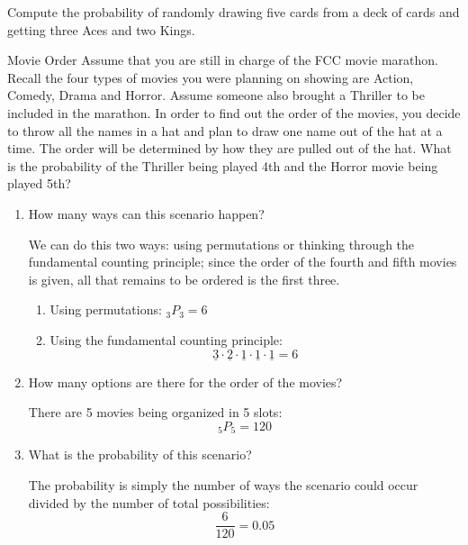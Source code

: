 \begin{try}
Compute the probability of randomly drawing five cards from a deck of cards and getting three Aces and two Kings.
\end{try}

\begin{example}[https://www.youtube.com/watch?v=vG46K6Fr8Yw&list=PLfmpjsIzhzts14-9s5QixRje97EI2oeMF&index=39]{Movie Order}
Assume that you are still in charge of the FCC movie marathon. Recall the
four types of movies you were planning on showing are Action, Comedy, Drama and Horror.
Assume someone also brought a Thriller to be included in the marathon. In order to find
out the order of the movies, you decide to throw all the names in a hat and plan to draw one
name out of the hat at a time. The order will be determined by how they are pulled out of
the hat. What is the probability of the Thriller being played 4th and the Horror movie being
played 5th?

\sol
\begin{enumerate}
\item How many ways can this scenario happen?

We can do this two ways: using permutations or thinking through the fundamental counting principle; since the order of the fourth and fifth movies is given, all that remains to be ordered is the first three.
\begin{enumerate}
\item Using permutations: $_3P_3 = 6$
\item Using the fundamental counting principle:
\[\underline{3} \cdot \underline{2} \cdot \underline{1} \cdot \underline{1} \cdot \underline{1} = 6\]
\end{enumerate}

\item How many options are there for the order of the movies?

There are 5 movies being organized in 5 slots: \[_5P_5 = 120\]

\item What is the probability of this scenario?

The probability is simply the number of ways the scenario could occur divided by the number of total possibilities:
\[\boxed{\dfrac{6}{120} = 0.05}\]
\end{enumerate}
\end{example}